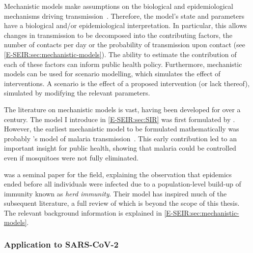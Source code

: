 \documentclass[thesis.tex]{subfiles}
\begin{document}
Mechanistic models make assumptions on the biological and epidemiological mechanisms driving transmission~\autocite{lesslerMechanistic}.
Therefore, the model's state and parameters have a biological and/or epidemiological interpretation.
In particular, this allows changes in transmission to be decomposed into the contributing factors, \eg the number of contacts per day or the probability of transmission upon contact (see \cref{E-SEIR:sec:mechanistic-models}).
The ability to estimate the contribution of each of these factors can inform public health policy.
Furthermore, mechanistic models can be used for scenario modelling, which simulates the effect of interventions.
A scenario is the effect of a proposed intervention (or lack thereof), simulated by modifying the relevant parameters.

The literature on mechanistic models is vast, having been developed for over a century.
The model I introduce in \cref{E-SEIR:sec:SIR} was first formulated by \textcite{kermackContribution}.
However, the earliest mechanistic model to be formulated mathematically was probably \textcite{rossMalariaA}'s model of malaria transmission~\autocite{lesslerMechanistic}.
This early contribution led to an important insight for public health, showing that malaria could be controlled even if mosquitoes were not fully eliminated.

\Textcite{kermackContribution} was a seminal paper for the field, explaining the observation that epidemics ended before all individuals were infected due to a population-level build-up of immunity known as \emph{herd immunity}.
Their model has inspired much of the subsequent literature, a full review of which is beyond the scope of this thesis.
The relevant background information is explained in \cref{E-SEIR:sec:mechanistic-models}.

\subsubsection{Application to SARS-CoV-2}
\end{document}
